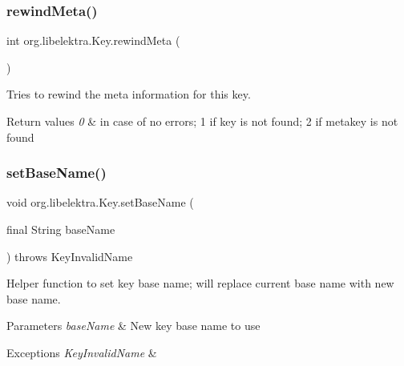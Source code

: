 \subsubsection{\texorpdfstring{rewindMeta()}{rewindMeta()}}
{\footnotesize\ttfamily int org.\+libelektra.\+Key.\+rewind\+Meta (\begin{DoxyParamCaption}{ }\end{DoxyParamCaption})\hspace{0.3cm}{\ttfamily [inline]}}



Tries to rewind the meta information for this key. 


\begin{DoxyRetVals}{Return values}
{\em 0} & in case of no errors; 1 if key is not found; 2 if metakey is not found \\
\hline
\end{DoxyRetVals}
\mbox{\label{classorg_1_1libelektra_1_1Key_a5226472bedc6a02dee826ee3facdb25f}} 
\subsubsection{\texorpdfstring{setBaseName()}{setBaseName()}}
{\footnotesize\ttfamily void org.\+libelektra.\+Key.\+set\+Base\+Name (\begin{DoxyParamCaption}\item[{final String}]{base\+Name }\end{DoxyParamCaption}) throws Key\+Invalid\+Name\hspace{0.3cm}{\ttfamily [inline]}}



Helper function to set key base name; will replace current base name with new base name. 


\begin{DoxyParams}{Parameters}
{\em base\+Name} & New key base name to use \\
\hline
\end{DoxyParams}

\begin{DoxyExceptions}{Exceptions}
{\em Key\+Invalid\+Name} & \\
\hline
\end{DoxyExceptions}
\mbox{\label{classorg_1_1libelektra_1_1Key_a005125c24abc41a799d73d09c8c148f1}} 
